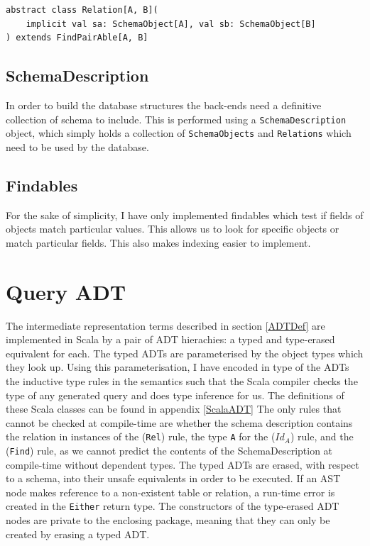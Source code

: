 \documentclass[12pt,a4paper,twoside,openright]{report}
\newcommand\codeName[1]{\texttt{#1}}
\renewcommand{\baselinestretch}{1.1}    %
\begin{document}
\renewcommand{\baselinestretch}{0.8}
\begin{framed}
\begin{verbatim}
abstract class Relation[A, B](
    implicit val sa: SchemaObject[A], val sb: SchemaObject[B]
) extends FindPairAble[A, B]
\end{verbatim}
\end{framed}
\renewcommand{\baselinestretch}{1.1}



	
	\subsection{SchemaDescription}
	
In order to build the database structures the back-ends need a definitive collection of schema to include. This is performed using a \codeName{SchemaDescription} object, which simply holds a collection of \codeName{SchemaObjects} and \codeName{Relations} which need to be used by the database.	
	
	\subsection{Findables}
	For the sake of simplicity, I have only implemented findables which test if fields of objects match particular values. This allows us to look for specific objects or match particular fields. This also makes indexing easier to implement.
	
\section{Query ADT}
The intermediate representation terms described in  section \ref{ADTDef} are implemented in Scala by a pair of ADT hierachies: a typed and type-erased equivalent for each. The typed ADTs are parameterised by the object types which they look up. Using this parameterisation, I have encoded in type of the ADTs the inductive type rules in the semantics such that the Scala compiler checks the type of any generated query and does type inference for us. The definitions of these Scala classes can be found in appendix \ref{ScalaADT} The only rules that cannot be checked at compile-time are whether the schema description contains the relation in instances of the (\codeName{Rel}) rule, the type \codeName{A} for the (\codeName{$Id_A$}) rule, and the (\codeName{Find}) rule, as we cannot predict the contents of the SchemaDescription at compile-time without dependent types.  The typed ADTs are erased, with respect to a schema,  into their unsafe equivalents in order to be executed. If an AST node makes reference to a non-existent table or relation, a run-time error is created in the \codeName{Either} return type. The constructors of the type-erased ADT nodes are private to the enclosing package, meaning that they can only be created by erasing a typed ADT.
	
\end{document}
